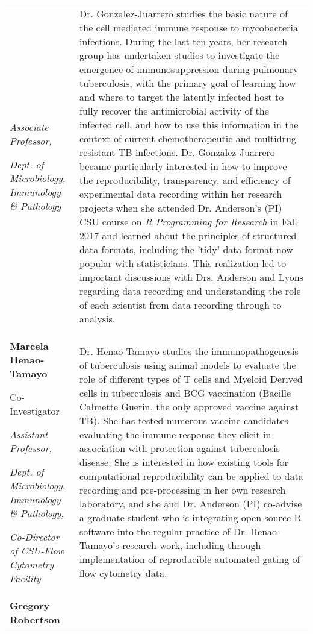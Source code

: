 \begin{table}
\begin{tabular}[t]{>{\raggedright\arraybackslash}p{14em}>{\raggedright\arraybackslash}p{45em}}
  \textit{Associate Professor,}
  
  \textit{Dept. of Microbiology, Immunology \& Pathology} & Dr. Gonzalez-Juarrero studies the basic nature of the
  cell mediated immune response to mycobacteria infections. During the last ten
  years, her research group has undertaken studies to investigate the emergence of
  immunosuppression during pulmonary tuberculosis, with the primary goal of
  learning how and where to target the latently infected host to fully recover the
  antimicrobial activity of the infected cell, and how to use this information in
  the context of current chemotherapeutic and multidrug resistant TB infections.
  Dr. Gonzalez-Juarrero became particularly interested in how to improve the
  reproducibility, transparency, and efficiency of experimental data recording
  within her research projects when she attended Dr. Anderson's (PI) CSU course on
  \textit{R Programming for Research} in Fall 2017 and learned about the
  principles of structured data formats, including the 'tidy' data format now
  popular with statisticians. This realization led to important discussions with
  Drs. Anderson and Lyons regarding data recording and understanding the role of
  each scientist from data recording through to analysis.\\
\textbf{Marcela Henao-Tamayo}
  
  Co-Investigator
  
  \textit{Assistant Professor,}
  
  \textit{Dept. of Microbiology, Immunology \& Pathology,}
  
  \textit{Co-Director of CSU-Flow Cytometry Facility} & Dr. Henao-Tamayo studies the immunopathogenesis of
  tuberculosis using animal models to evaluate the role of different types of T
  cells and Myeloid Derived cells in tuberculosis and BCG vaccination (Bacille
  Calmette Guerin, the only approved vaccine against TB). She has tested numerous
  vaccine candidates evaluating the immune response they elicit in association
  with protection against tuberculosis disease. She is interested in how existing
  tools for computational reproducibility can be applied to data recording and
  pre-processing in her own research laboratory, and she and Dr. Anderson (PI)
  co-advise a graduate student who is integrating open-source R software into the
  regular practice of Dr. Henao-Tamayo's research work, including through
  implementation of reproducible automated gating of flow cytometry data.\\
\textbf{Gregory Robertson}
  

\end{tabular}
\end{table}
